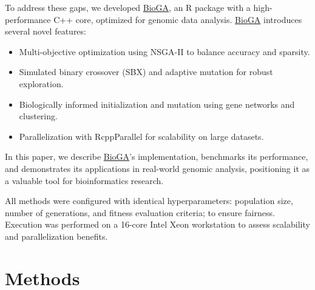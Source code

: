 \documentclass{report}
\begin{document}
To address these gaps, we developed \textcolor{teal}{\href{https://bioconductor.org/packages/release/bioc/html/BioGA.html}{BioGA}}, an R package with a high-performance C++ core, optimized for genomic data analysis. \textcolor{teal}{\href{https://bioconductor.org/packages/release/bioc/html/BioGA.html}{BioGA}} introduces several novel features:
\begin{itemize}
    \item Multi-objective optimization using NSGA-II to balance accuracy and sparsity.
    \item Simulated binary crossover (SBX) and adaptive mutation for robust exploration.
    \item Biologically informed initialization and mutation using gene networks and clustering.
    \item Parallelization with RcppParallel for scalability on large datasets.
\end{itemize}

In this paper, we describe \textcolor{teal}{\href{https://bioconductor.org/packages/release/bioc/html/BioGA.html}{BioGA}}’s implementation, benchmarks its performance, and demonstrates its applications in real-world genomic analysis, positioning it as a valuable tool for bioinformatics research.

All methods were configured with identical hyperparameters: population size, number of generations, and fitness evaluation criteria; to ensure fairness. Execution was performed on a 16-core Intel Xeon workstation to assess scalability and parallelization benefits.

\newpage

\section{Methods}
\end{document}
